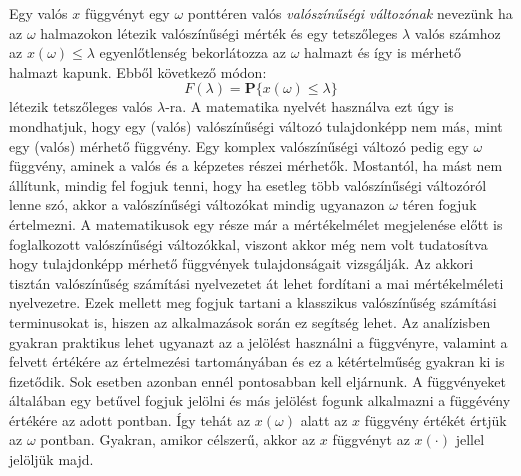 \documentclass{article}
\begin{document}
Egy valós $x$ függvényt egy $\omega$ ponttéren valós \textit{valószínűségi változónak} nevezünk ha az $\omega$ halmazokon létezik valószínűségi mérték és egy tetszőleges $\lambda$ valós számhoz az $x(\omega) \leq \lambda$ egyenlőtlenség bekorlátozza az $\omega$ halmazt és így is mérhető halmazt kapunk. Ebből következő módon: 
\begin{equation}
F(\lambda) = \mathbf{P}\{x(\omega) \leq \lambda\}
	\label{eq:distributionfunction}
\end{equation}
létezik tetszőleges valós $\lambda$-ra. A matematika nyelvét használva ezt úgy is mondhatjuk, hogy egy (valós) valószínűségi változó tulajdonképp nem más, mint egy (valós) mérhető függvény. Egy komplex valószínűségi változó pedig egy $\omega$ függvény, aminek a valós és a képzetes részei mérhetők. Mostantól, ha mást nem állítunk, mindig fel fogjuk tenni, hogy ha esetleg több valószínűségi változóról lenne szó, akkor a valószínűségi változókat mindig ugyanazon $\omega$ téren fogjuk értelmezni. A matematikusok egy része már a mértékelmélet megjelenése előtt is foglalkozott valószínűségi változókkal, viszont akkor még nem volt tudatosítva hogy tulajdonképp mérhető függvények tulajdonságait vizsgálják. Az akkori tisztán valószínűség számítási nyelvezetet át lehet fordítani a mai mértékelméleti nyelvezetre. Ezek mellett meg fogjuk tartani a klasszikus valószínűség számítási terminusokat is, hiszen az alkalmazások során ez segítség lehet. Az analízisben gyakran praktikus lehet ugyanazt az a jelölést használni a függvényre, valamint a felvett értékére az értelmezési tartományában és ez a kétértelműség gyakran ki is fizetődik. Sok esetben azonban ennél pontosabban kell eljárnunk. A függvényeket általában egy betűvel fogjuk jelölni és más jelölést fogunk alkalmazni a függévény értékére az adott pontban. Így tehát az $x(\omega)$ alatt az $x$ függvény értékét értjük az $\omega$ pontban. Gyakran, amikor célszerű, akkor az $x$ függvényt az $x(\cdot)$ jellel jelöljük majd. 
\end{document}
